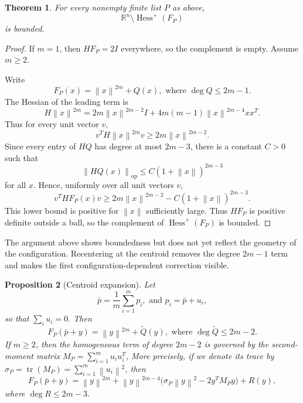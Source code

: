 \documentclass[11pt]{amsart}
\newtheorem{theorem}{Theorem}[section]
\newtheorem{proposition}[theorem]{Proposition}
\theoremstyle{remark}
\newcommand{\Hessp}{\operatorname{Hess}^{+}}
\newcommand{\R}{\mathbb{R}}
\newcommand{\norm}[1]{\left\lVert #1\right\rVert}
\begin{document}
\begin{theorem}\label{thm:finite-products-bounded-complement}
For every nonempty finite list $P$ as above,
\[
 \R^n\setminus\Hessp(F_P)
\]
is bounded.
\end{theorem}

\begin{proof}
If $m=1$, then $HF_P=2I$ everywhere, so the complement is empty. Assume
$m\ge2$.

Write
\[
 F_P(x)=\norm{x}^{2m}+Q(x),\text{ where } \deg Q\le 2m-1.
\]
The Hessian of the leading term is
\[
 H\norm{x}^{2m}=2m\norm{x}^{2m-2}I+4m(m-1)\norm{x}^{2m-4}xx^T.
\]
Thus for every unit vector $v$,
\[
 v^T H\norm{x}^{2m}v\ge 2m\norm{x}^{2m-2}.
\]
Since every entry of $HQ$ has degree at most $2m-3$, there is a constant
$C>0$ such that
\[
 \norm{HQ(x)}_{\mathrm{op}}\le C(1+\norm{x})^{2m-3}
\]
for all $x$. Hence, uniformly over all unit vectors $v$,
\[
 v^T HF_P(x)v
 \ge 2m\norm{x}^{2m-2}-C(1+\norm{x})^{2m-3}.
\]
This lower bound is positive for $\norm{x}$ sufficiently large. Thus $HF_P$
is positive definite outside a ball, so the complement of $\Hessp(F_P)$ is
bounded.
\end{proof}

The argument above shows boundedness but does not yet reflect the geometry of the configuration. Recentering at the centroid removes the degree $2m-1$ term and makes the first configuration-dependent correction visible. 

\begin{proposition}[Centroid expansion]\label{prop:centroid-expansion}
Let
\[
 \bar p=\frac1m\sum_{i=1}^m p_i,\text{ and } p_i=\bar p+u_i,
\]
so that $\sum_i u_i=0$. Then 
\[
 F_P(\bar p+y)=\norm{y}^{2m}+\widetilde Q(y),
 \text{ where } \deg \widetilde Q\le 2m-2.
\]
If $m\ge2$, then the homogeneous term of degree $2m-2$ is governed by the
second-moment matrix $
 M_P=\sum_{i=1}^m u_i u_i^T$, More precisely, if we denote its trace by $
 \sigma_P=\operatorname{tr}(M_P)=\sum_{i=1}^m\norm{u_i}^2$, then 
\[
 F_P(\bar p+y)
 =
 \norm{y}^{2m}
 +\norm{y}^{2m-4}
  \bigl(\sigma_P\norm{y}^2-2y^T M_Py\bigr)
 +R(y),
\]
where $\deg R\le 2m-3$.
\end{proposition}
\end{document}

